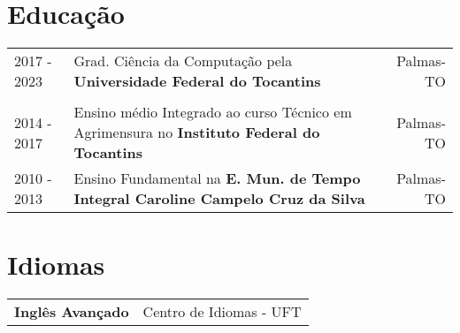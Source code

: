 \documentclass[a4paper,12pt]{article}
\begin{document}
\section{Educação}
\begin{tabularx}{\linewidth}{lXr}	
2017 - 2023 & Grad. Ciência da Computação pela \textbf{Universidade Federal do Tocantins} & Palmas-TO \\\\

2014 - 2017 & Ensino médio Integrado ao curso Técnico em Agrimensura no \textbf{Instituto Federal do Tocantins} & Palmas-TO \\ 

2010 - 2013 & Ensino Fundamental na \textbf{E. Mun. de Tempo Integral Caroline Campelo Cruz da Silva} & Palmas-TO \\ 
\end{tabularx}


\section{Idiomas}
\begin{tabularx}{\linewidth}{@{}l X@{}}
\textbf{Inglês Avançado} & \hfill Centro de Idiomas - UFT \\
\end{tabularx}


\end{document}
